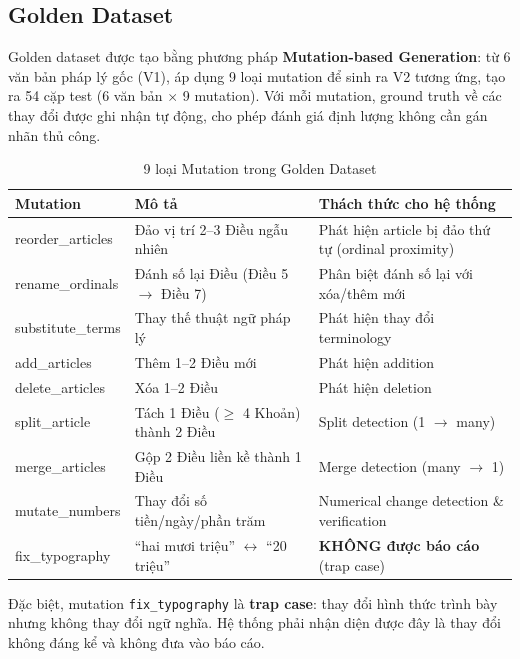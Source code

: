 \subsection{Golden Dataset}

Golden dataset được tạo bằng phương pháp \textbf{Mutation-based Generation}: từ 6 văn bản pháp lý gốc (V1), áp dụng 9 loại mutation để sinh ra V2 tương ứng, tạo ra 54 cặp test (6 văn bản $\times$ 9 mutation). Với mỗi mutation, ground truth về các thay đổi được ghi nhận tự động, cho phép đánh giá định lượng không cần gán nhãn thủ công.

\begin{table}[H]
    \centering
    \caption{9 loại Mutation trong Golden Dataset}
    \label{tab:mutations}
    \begin{tabularx}{\textwidth}{X X X}
        \toprule
        \textbf{Mutation} & \textbf{Mô tả} & \textbf{Thách thức cho hệ thống}\\
        \midrule
        reorder\_articles & Đảo vị trí 2--3 Điều ngẫu nhiên & Phát hiện article bị đảo thứ tự (ordinal proximity)\\
        rename\_ordinals & Đánh số lại Điều (Điều 5 $\rightarrow$ Điều 7) & Phân biệt đánh số lại với xóa/thêm mới\\
        substitute\_terms & Thay thế thuật ngữ pháp lý & Phát hiện thay đổi terminology\\
        add\_articles & Thêm 1--2 Điều mới & Phát hiện addition\\
        delete\_articles & Xóa 1--2 Điều & Phát hiện deletion\\
        split\_article & Tách 1 Điều ($\geq$ 4 Khoản) thành 2 Điều & Split detection (1 $\rightarrow$ many)\\
        merge\_articles & Gộp 2 Điều liền kề thành 1 Điều & Merge detection (many $\rightarrow$ 1)\\
        mutate\_numbers & Thay đổi số tiền/ngày/phần trăm & Numerical change detection \& verification\\
        fix\_typography & ``hai mươi triệu'' $\leftrightarrow$ ``20 triệu'' & \textbf{KHÔNG được báo cáo} (trap case)\\
        \bottomrule
    \end{tabularx}
\end{table}

Đặc biệt, mutation \texttt{fix\_typography} là \textbf{trap case}: thay đổi hình thức trình bày nhưng không thay đổi ngữ nghĩa. Hệ thống phải nhận diện được đây là thay đổi không đáng kể và không đưa vào báo cáo.

